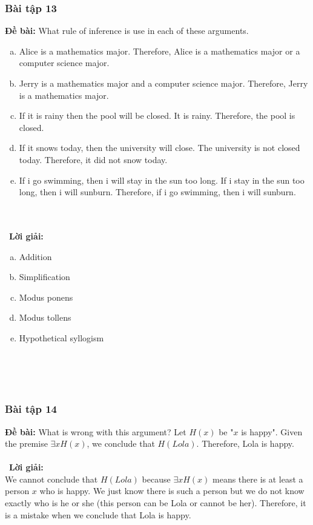 \documentclass[a4paper]{article}
\begin{document}
\subsubsection{Bài tập 13}
\textbf{Đề bài:}  What rule of inference is use in each of these arguments.
\begin{enumerate}[a)]
	\item Alice is a mathematics major. Therefore, Alice is a mathematics major or a computer science major.
	\item  Jerry is a mathematics major and a computer science major. Therefore, Jerry is a mathematics major.
	\item If it is rainy then the pool will be closed. It is rainy. Therefore, the pool is closed.
	\item If it snows today, then the university will close. The university is not closed today. Therefore, it did not snow today.
	\item If i go swimming, then i will stay in the sun too long. If i stay in the sun too long, then i will sunburn. Therefore, if i go swimming, then i will sunburn. 
	\end{enumerate}
\\\ \\\
\textbf{Lời giải:} \begin{enumerate}[a)]
	\item Addition
	\item Simplification
	\item Modus ponens
	\item Modus tollens
	\item Hypothetical syllogism 
	\end{enumerate}
 \\\ \\\
\clearpage
\subsubsection{Bài tập 14}
\textbf{Đề bài:}  What is wrong with this argument? Let $H(x)$ be "$x$ is happy". Given the premise $\exists xH(x)$, we conclude that $H(Lola)$. Therefore, Lola is happy.
\\\ \\\
\textbf{Lời giải:} \\We cannot conclude that $H(Lola)$ because $\exists xH(x)$ means there is at least a person $x$ who is happy. We just know there is such a person but we do not know exactly who is he or she (this person can be Lola or cannot be her). Therefore, it is a mistake when we conclude that Lola is happy.
 \\\ \\\
\clearpage
\end{document}
